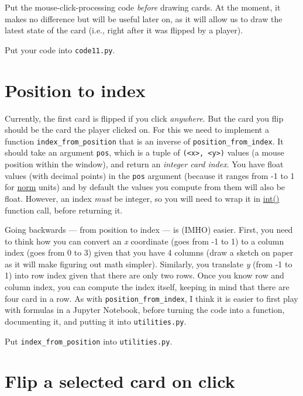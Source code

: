 \documentclass[
]{book}
\begin{document}
Put the mouse-click-processing code \emph{before} drawing cards. At the moment, it makes no difference but will be useful later on, as it will allow us to draw the latest state of the card (i.e., right after it was flipped by a player).

Put your code into \texttt{code11.py}.

\hypertarget{position-to-index}{%
\section{Position to index}\label{position-to-index}}

Currently, the first card is flipped if you click \emph{anywhere}. But the card you flip should be the card the player clicked on. For this we need to implement a function \texttt{index\_from\_position} that is an inverse of \texttt{position\_from\_index}. It should take an argument \texttt{pos}, which is a tuple of \texttt{(\textless{}x\textgreater{},\ \textless{}y\textgreater{})} values (a mouse position within the window), and return an \emph{integer card index}. You have float values (with decimal points) in the \texttt{pos} argument (because it ranges from -1 to 1 for \protect\hyperlink{psychopy-units-norm}{norm} units) and by default the values you compute from them will also be float. However, an index \emph{must} be integer, so you will need to wrap it in \href{https://docs.python.org/3/library/functions.html\#int}{int()} function call, before returning it.

Going backwards --- from position to index --- is (IMHO) easier. First, you need to think how you can convert an \emph{x} coordinate (goes from -1 to 1) to a column index (goes from 0 to 3) given that you have 4 columns (draw a sketch on paper as it will make figuring out math simpler). Similarly, you translate \emph{y} (from -1 to 1) into row index given that there are only two rows. Once you know row and column index, you can compute the index itself, keeping in mind that there are four card in a row. As with \texttt{position\_from\_index}, I think it is easier to first play with formulas in a Jupyter Notebook, before turning the code into a function, documenting it, and putting it into \texttt{utilities.py}.

Put \texttt{index\_from\_position} into \texttt{utilities.py}.

\hypertarget{flip-a-selected-card-on-click}{%
\section{Flip a selected card on click}\label{flip-a-selected-card-on-click}}
\end{document}
